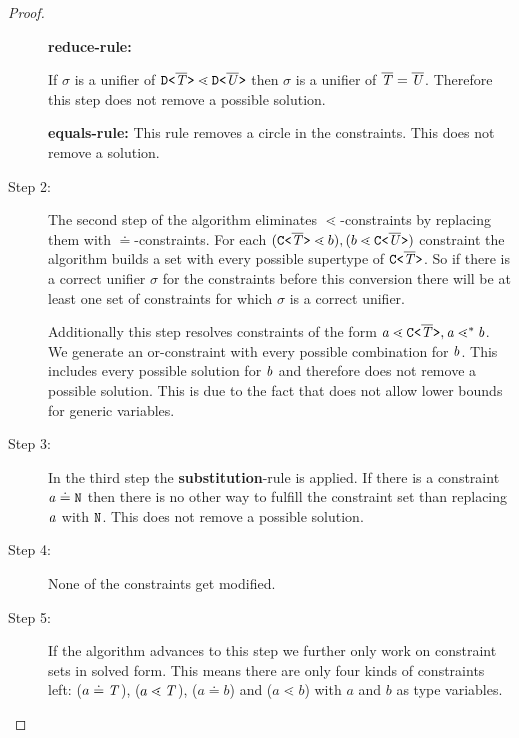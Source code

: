 \begin{proof}
\begin{description}
\textbf{reduce-rule:}

If $\sigma$ is a unifier of $\mathtt{D \texttt{<} \overline{\tt \mathit{T}} \texttt{>} } \lessdot
\mathtt{D \texttt{<} \overline{\tt \mathit{U}} \texttt{>} }$
then $\sigma$ is a unifier of $\overline{\tt \mathit{T}} = \overline{\tt \mathit{U}}$.
Therefore this step does not remove a possible solution.

\textbf{equals-rule:}
This rule removes a circle in the constraints.
This does not remove a solution.

\item[Step 2:]
The second step of the algorithm eliminates $\lessdot$-constraints
by replacing them with $\doteq$-constraints.
For each $(\mathtt{C \texttt{<} \overline{\tt \mathit{T}} \texttt{>} } \lessdot b), (b \lessdot \mathtt{C \texttt{<} \overline{\tt \mathit{U}} \texttt{>} })$ constraint the algorithm builds a set with every
possible supertype of $\mathtt{C \texttt{<} \overline{\tt \mathit{T}} \texttt{>} }$.
So if there is a correct unifier $\sigma$ for the constraints before this conversion there will be at least one set of
constraints for which $\sigma$ is a correct unifier.

Additionally this step resolves constraints of the form $\mathit{ a } \lessdot \mathtt{C \texttt{<} \overline{\tt \mathit{T}} \texttt{>} }, \mathit{ a } \lessdot^* \mathit{ b }$.
We generate an or-constraint with every possible combination for $\mathit{ b }$.
This includes every possible solution for $\mathit{ b }$ and therefore does not remove a possible solution.
This is due to the fact that \TFGJ does not allow lower bounds for generic variables.

\item[Step 3:]
In the third step the \textbf{substitution}-rule is applied.
If there is a constraint $\mathit{ a } \doteq \texttt{N}$ then there is no other way to fulfill the constraint set
than replacing $\mathit{ a }$ with $\texttt{N}$.
This does not remove a possible solution.

\item[Step 4:]
None of the constraints get modified.

\item[Step 5:]
If the algorithm advances to this step we further only work on constraint sets in solved form.
This means there are only four kinds of constraints left:
($a \doteq \mathit{T}$), ($a \lessdot \mathit{T}$), ($a \doteq b$) and ($a \lessdot b$) with $a$ and $b$ as type variables.



\end{description}
\end{proof}
